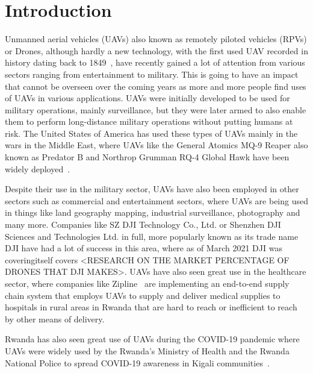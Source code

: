 
\chapter{Introduction}
\label{cha:thesis-introduction}

Unmanned aerial vehicles (UAVs) also known as remotely piloted vehicles (RPVs) or Drones, although hardly a new technology, with the first used UAV recorded in history dating back to 1849~\cite{vasileprisacariujdrm2017}, have recently gained a lot of attention from various sectors ranging from entertainment to military. This is going to have an impact that cannot be overseen over the coming years as more and more people find uses of UAVs in various applications. UAVs were initially developed to be used for military operations, mainly surveillance, but they were later armed to also enable them to perform long-distance military operations without putting humans at risk. The United States of America has used these types of UAVs mainly in the wars in the Middle East, where UAVs like the General Atomics MQ-9 Reaper also known as Predator B and Northrop Grumman RQ-4 Global Hawk have been widely deployed~\cite{samaanorientxxi2022}.

Despite their use in the military sector, UAVs have also been employed in other sectors such as commercial and entertainment sectors, where UAVs are being used in things like land geography mapping, industrial surveillance, photography and many more. Companies like SZ DJI Technology Co., Ltd. or Shenzhen DJI Sciences and Technologies Ltd. in full, more popularly known as its trade name DJI have had a lot of success in this area, where as of March 2021 DJI was coveringitself covers <RESEARCH ON THE MARKET PERCENTAGE OF DRONES THAT DJI MAKES>. UAVs have also seen great use in the healthcare sector, where companies like Zipline~\cite{droneslevy2022} are implementing an end-to-end supply chain system that employs UAVs to supply and deliver medical supplies to hospitals in rural areas in Rwanda that are hard to reach or inefficient to reach by other means of delivery.

Rwanda has also seen great use of UAVs during the COVID-19 pandemic where UAVs were widely used by the Rwanda’s Ministry of Health and the Rwanda National Police to spread COVID-19 awareness in Kigali communities~\cite{whoafricarw2020}.


